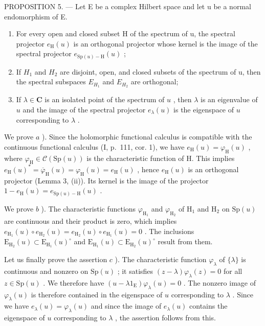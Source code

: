 PROPOSITION 5. --- Let E be a complex Hilbert space and let u be a normal endomorphism of E.

\begin{enumerate}
\def\labelenumi{\alph{enumi})}
\item
  For every open and closed subset H of the spectrum of u, the spectral projector \(e_{\mathrm{H}}(u)\) is an orthogonal projector whose kernel is the image of the spectral projector \(e_{\mathrm{Sp}(u)-\mathrm{H}}(u)\) ;
\item
  If \(H_{1}\) and \(H_{2}\) are disjoint, open, and closed subsets of the spectrum of u, then the spectral subspaces \(E_{H_{1}}\) and \(E_{H_{2}}\) are orthogonal;
\item
  If \(\lambda \in \mathbf{C}\) is an isolated point of the spectrum of \(u\) , then \(\lambda\) is an eigenvalue of \(u\) and the image of the spectral projector \(e_{\lambda}(u)\) is the eigenspace of \(u\) corresponding to \(\lambda\) .
\end{enumerate}

We prove \(a\) ). Since the holomorphic functional calculus is compatible with the continuous functional calculus (I, p.~111, cor. 1), we have \(e_{\mathrm{H}}(u) = \varphi_{\mathrm{H}}(u)\) , where \(\varphi_{\mathrm{H}} \in \mathcal{C}(\mathrm{Sp}(u))\) is the characteristic function of H. This implies \(e_{\mathrm{H}}(u)^{*} = \overline{\varphi}_{\mathrm{H}}(u) = \varphi_{\mathrm{H}}(u) = e_{\mathrm{H}}(u)\) , hence \(e_{\mathrm{H}}(u)\) is an orthogonal projector (Lemma 3, (ii)). Its kernel is the image of the projector \(1 - e_{\mathrm{H}}(u) = e_{\mathrm{Sp}(u) - \mathrm{H}}(u)\) .

We prove \(b\) ). The characteristic functions \(\varphi_{\mathrm{H}_{1}}\) and \(\varphi_{\mathrm{H}_{2}}\) of \(\mathrm{H}_{1}\) and \(\mathrm{H}_{2}\) on \(\mathrm{Sp}(u)\) are continuous and their product is zero, which implies \(e_{\mathrm{H}_{1}}(u)\circ e_{\mathrm{H}_{2}}(u)=e_{\mathrm{H}_{2}}(u)\circ e_{\mathrm{H}_{1}}(u)=0\) . The inclusions \(\mathrm{E}_{\mathrm{H}_{2}}(u)\subset\mathrm{E}_{\mathrm{H}_{1}}(u)^{\circ}\) and \(\mathrm{E}_{\mathrm{H}_{1}}(u)\subset\mathrm{E}_{\mathrm{H}_{2}}(u)^{\circ}\) result from them.

Let us finally prove the assertion \(c\) ). The characteristic function \(\varphi_{\lambda}\) of \(\{\lambda\}\) is continuous and nonzero on \(\mathrm{Sp}(u)\) ; it satisfies \((z - \lambda)\varphi_{\lambda}(z) = 0\) for all \(z \in \mathrm{Sp}(u)\) . We therefore have \((u - \lambda 1_{\mathrm{E}})\varphi_{\lambda}(u) = 0\) . The nonzero image of \(\varphi_{\lambda}(u)\) is therefore contained in the eigenspace of \(u\) corresponding to \(\lambda\) . Since we have \(e_{\lambda}(u) = \varphi_{\lambda}(u)\) and since the image of \(e_{\lambda}(u)\) contains the eigenspace of \(u\) corresponding to \(\lambda\) , the assertion follows from this.

